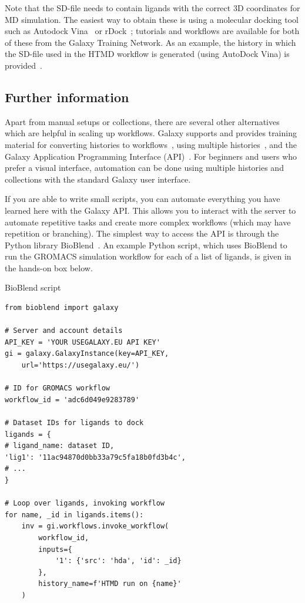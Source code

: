 \documentclass[twocolumn]{bmcart}%
\begin{document}
Note that the SD-file needs to contain ligands with the correct 3D coordinates for MD simulation. The easiest way to obtain these is using a molecular docking tool such as Autodock Vina~\cite{Trott2009} or rDock~\cite{Ruiz2014}; tutorials and workflows are available for both of these from the Galaxy Training Network. As an example, the history in which the SD-file used in the HTMD workflow is generated (using AutoDock Vina) is provided~\cite{eu_6hhr}.

\subsection*{Further information}

Apart from manual setups or collections, there are several other alternatives which are helpful in scaling up workflows. Galaxy supports and provides training material for converting histories to workflows~\cite{gtn_toworkflow}, using multiple histories~\cite{gtn_multiple}, and the Galaxy Application Programming Interface (API)~\cite{gtn_api}. For beginners and users who prefer a visual interface, automation can be done using multiple histories and collections with the standard Galaxy user interface. 

If you are able to write small scripts, you can automate everything you have learned here with the Galaxy API. This allows you to interact with the server to automate repetitive tasks and create more complex workflows (which may have repetition or branching). The simplest way to access the API is through the Python library BioBlend~\cite{sloggett_bioblend}. An example Python script, which uses BioBlend to run the GROMACS simulation workflow for each of a list of ligands, is given in the hands-on box below. 
\begin{handson_box_colour}{BioBlend script}
\begin{verbatim} 
from bioblend import galaxy

# Server and account details
API_KEY = 'YOUR USEGALAXY.EU API KEY'
gi = galaxy.GalaxyInstance(key=API_KEY,
    url='https://usegalaxy.eu/')

# ID for GROMACS workflow
workflow_id = 'adc6d049e9283789' 

# Dataset IDs for ligands to dock
ligands = {
# ligand_name: dataset ID,
'lig1': '11ac94870d0bb33a79c5fa18b0fd3b4c',
# ...
}

# Loop over ligands, invoking workflow
for name, _id in ligands.items():
    inv = gi.workflows.invoke_workflow(
        workflow_id,
        inputs={
            '1': {'src': 'hda', 'id': _id}
        },
        history_name=f'HTMD run on {name}'
    )
\end{verbatim}
\end{handson_box_colour}
\end{document}
